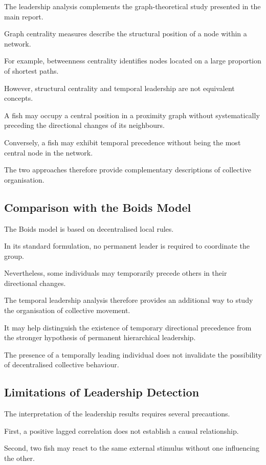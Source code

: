 \documentclass[10pt,a4paper]{article}
\begin{document}
The leadership analysis complements
the graph-theoretical study
presented in the main report.

Graph centrality measures
describe the structural position
of a node within a network.

For example, betweenness
centrality identifies nodes
located on a large proportion
of shortest paths.

However, structural centrality
and temporal leadership
are not equivalent concepts.

A fish may occupy a central
position in a proximity graph
without systematically
preceding the directional
changes of its neighbours.

Conversely, a fish may exhibit
temporal precedence
without being the most
central node in the network.

The two approaches therefore
provide complementary
descriptions of collective
organisation.

\subsection{Comparison with the Boids Model}

The Boids model is based
on decentralised local rules.

In its standard formulation,
no permanent leader
is required to coordinate
the group.

Nevertheless, some
individuals may temporarily
precede others in their
directional changes.

The temporal leadership
analysis therefore provides
an additional way to study
the organisation of
collective movement.

It may help distinguish
the existence of
temporary directional
precedence from
the stronger hypothesis
of permanent hierarchical
leadership.

The presence of a
temporally leading
individual does not
invalidate the possibility
of decentralised
collective behaviour.

\subsection{Limitations of Leadership Detection}

The interpretation of
the leadership results
requires several precautions.

First, a positive
lagged correlation
does not establish
a causal relationship.

Second, two fish may
react to the same
external stimulus
without one influencing
the other.
\end{document}
